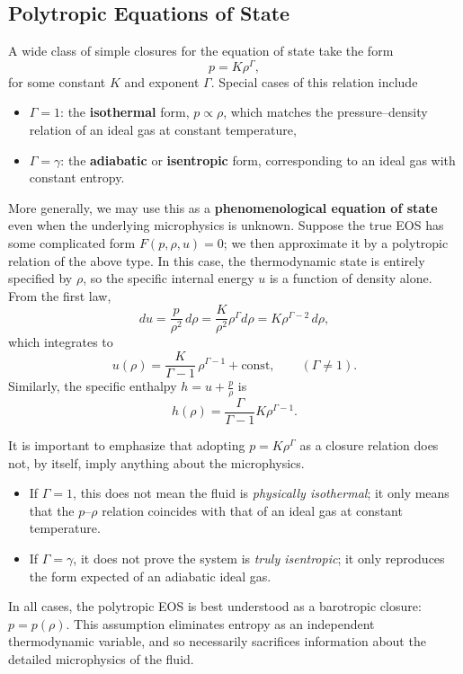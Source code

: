 \subsection{Polytropic Equations of State}

A wide class of simple closures for the equation of state take the form
\[
p = K \rho^{\Gamma},
\]
for some constant $K$ and exponent $\Gamma$. Special cases of this relation include
\begin{itemize}
    \item $\Gamma = 1$: the \textbf{isothermal} form, $p \propto \rho$, which matches the pressure--density relation of an ideal gas at constant temperature,
    \item $\Gamma = \gamma$: the \textbf{adiabatic} or \textbf{isentropic} form, corresponding to an ideal gas with constant entropy.
\end{itemize}

More generally, we may use this as a \textbf{phenomenological equation of state} even when the underlying microphysics is unknown. Suppose the true EOS has some complicated form $F(p,\rho,u)=0$; we then approximate it by a polytropic relation of the above type. In this case, the thermodynamic state is entirely specified by $\rho$, so the specific internal energy $u$ is a function of density alone. From the first law,
\[
du = \frac{p}{\rho^2}\, d\rho 
= \frac{K}{\rho^2}\rho^\Gamma d\rho 
= K \rho^{\Gamma-2}\, d\rho,
\]
which integrates to
\[
u(\rho) = \frac{K}{\Gamma - 1}\,\rho^{\Gamma - 1} + \text{const}, \qquad (\Gamma \neq 1).
\]
Similarly, the specific enthalpy $h = u + \tfrac{p}{\rho}$ is
\[
h(\rho) = \frac{\Gamma}{\Gamma - 1} K \rho^{\Gamma - 1}.
\]

\begin{remark}
It is important to emphasize that adopting $p = K \rho^{\Gamma}$ as a closure relation does not, by itself, imply anything about the microphysics. 
\begin{itemize}
    \item If $\Gamma = 1$, this does not mean the fluid is \emph{physically isothermal}; it only means that the $p$--$\rho$ relation coincides with that of an ideal gas at constant temperature. 
    \item If $\Gamma = \gamma$, it does not prove the system is \emph{truly isentropic}; it only reproduces the form expected of an adiabatic ideal gas. 
\end{itemize}
In all cases, the polytropic EOS is best understood as a barotropic closure: $p = p(\rho)$. This assumption eliminates entropy as an independent thermodynamic variable, and so necessarily sacrifices information about the detailed microphysics of the fluid.
\end{remark}

